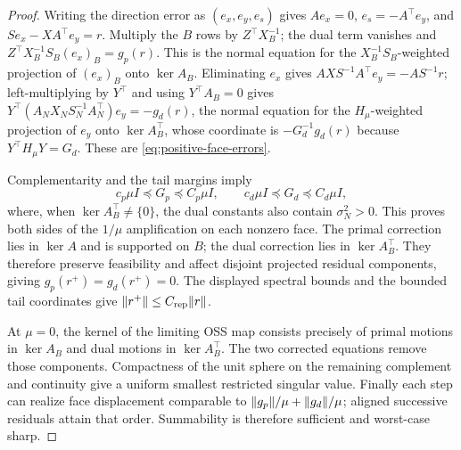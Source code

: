 \begin{proof}
Writing the direction error as $(e_x,e_y,e_s)$ gives
$Ae_x=0$, $e_s=-A^\top e_y$, and $Se_x-XA^\top e_y=r$.  Multiply the $B$ rows by
$Z^\top X_B^{-1}$; the dual term vanishes and
$Z^\top X_B^{-1}S_B(e_x)_B=g_p(r)$.  This is the normal equation for the
$X_B^{-1}S_B$-weighted projection of $(e_x)_B$ onto $\ker A_B$.  Eliminating
$e_x$ gives $AXS^{-1}A^\top e_y=-AS^{-1}r$; left-multiplying by $Y^\top$ and using
$Y^\top A_B=0$ gives
$Y^\top(A_NX_NS_N^{-1}A_N^\top)e_y=-g_d(r)$, the normal equation for the
$H_\mu$-weighted projection of $e_y$ onto $\ker A_B^\top$, whose coordinate is
$-G_d^{-1}g_d(r)$ because $Y^\top H_\mu Y=G_d$.  These are
\eqref{eq:positive-face-errors}.

Complementarity and the tail margins imply
\[
 c_p\mu I\preceq G_p\preceq C_p\mu I,\qquad
 c_d\mu I\preceq G_d\preceq C_d\mu I,
\]
where, when $\ker A_B^\top\ne\{0\}$, the dual constants also contain
$\sigma_N^2>0$.  This proves both sides of the $1/\mu$ amplification on each
nonzero face.  The primal correction lies in $\ker A$ and is
supported on $B$; the dual correction lies in $\ker A_B^\top$.  They therefore
preserve feasibility and affect disjoint projected residual components, giving
$g_p(r^+)=g_d(r^+)=0$.  The displayed spectral bounds and the bounded tail
coordinates give $\lVert r^+\rVert\leq C_{\rm rep}\lVert r\rVert$.

At $\mu=0$, the kernel of the limiting OSS map consists precisely of primal
motions in $\ker A_B$ and dual motions in $\ker A_B^\top$.  The two corrected
equations remove those components.  Compactness of the unit sphere on the
remaining complement and continuity give a uniform smallest restricted
singular value.  Finally each step can realize face displacement comparable
to $\lVert g_p\rVert/\mu+\lVert g_d\rVert/\mu$; aligned successive residuals attain that
order.  Summability is therefore sufficient and worst-case sharp.
\end{proof}

